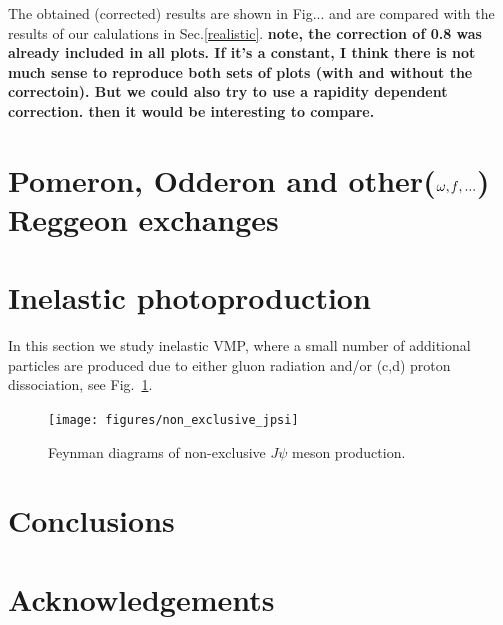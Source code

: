 \documentclass[12pt]{article}
\begin{document}
The obtained (corrected) results are shown in Fig... and are compared with the results of our calulations in Sec.\ref{realistic}.
{\tiny\bf note, the correction of 0.8 was already included in all plots. If it's a constant, I think there is not much sense to reproduce both sets of plots (with and without the correctoin). But we could also try to use a rapidity dependent correction. then it would be interesting to compare.}
\section{Pomeron, Odderon and other($\omega, {\it f},...$) Reggeon exchanges}\label{Reggeons}

\section{Inelastic photoproduction} 
In this section we study inelastic VMP, where a small number of additional particles are produced due to either gluon radiation and/or (c,d) proton dissociation, see Fig.~\ref{fig:vmp_non_exlcusive}.

\begin{figure}[!h]
\centering
 \texttt{[image: figures/non\_exclusive\_jpsi]}
 \caption{Feynman diagrams of non-exclusive $J\psi$ meson production.}
 \label{fig:vmp_non_exlcusive}
\end{figure}

\section{Conclusions}

\section*{Acknowledgements}
\end{document}
